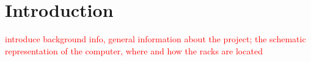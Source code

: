 \section{Introduction}
\noindent

\textcolor{red}{introduce background info, general information about the project; the schematic representation of the computer, where and how the racks are located}
\vspace{-15pt}